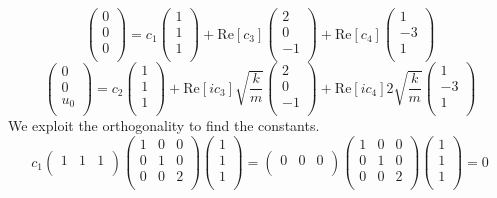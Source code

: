 \documentclass[a4paper]{article}
\begin{document}
\begin{ans}
$$\begin{pmatrix}0\\0\\0\\\end{pmatrix}=c_1\begin{pmatrix}1\\1\\1\\\end{pmatrix}+\text{Re}[c_3]\begin{pmatrix}2\\0\\-1\\\end{pmatrix}+\text{Re}[c_4]\begin{pmatrix}1\\-3\\1\\\end{pmatrix}$$
$$\begin{pmatrix}0\\0\\u_0\\\end{pmatrix}=c_2\begin{pmatrix}1\\1\\1\\\end{pmatrix}+\text{Re}[ic_3]\sqrt{\frac{k}{m}}\begin{pmatrix}2\\0\\-1\\\end{pmatrix}+\text{Re}[ic_4]2\sqrt{\frac{k}{m}}\begin{pmatrix}1\\-3\\1\\\end{pmatrix}$$
We exploit the orthogonality to find the constants.
$$c_1\begin{pmatrix}1&1&1\\\end{pmatrix}\begin{pmatrix}1&0&0\\0&1&0\\0&0&2\\\end{pmatrix}\begin{pmatrix}1\\1\\1\\\end{pmatrix}=\begin{pmatrix}0&0&0\\\end{pmatrix}\begin{pmatrix}1&0&0\\0&1&0\\0&0&2\\\end{pmatrix}\begin{pmatrix}1\\1\\1\\\end{pmatrix}=0$$

\end{ans}
\end{document}
